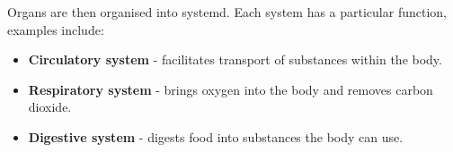 \documentclass{article}
\begin{document}
Organs are then organised into systemd. Each system has a particular function,
examples include:

\begin{itemize}

    \item {\bf Circulatory system} - facilitates transport of substances within
	the body.

    \item {\bf Respiratory system} - brings oxygen into the body and removes
	carbon dioxide.

	\item {\bf Digestive system} - digests food into substances the body can
	use.

\end{itemize}
\end{document}
